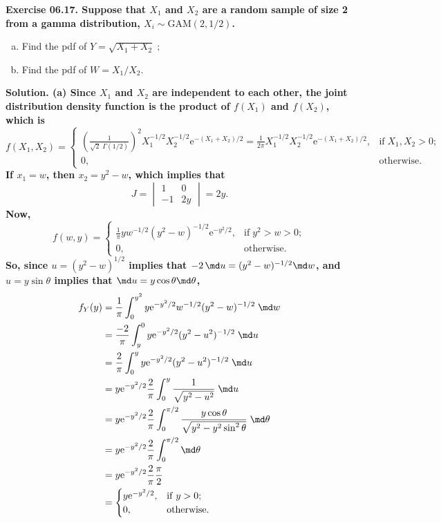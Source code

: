 \newcommand{\me}{\mathrm{e}}
\par{}
\vspace{1cm}

  \bf{Exercise 06.17.} Suppose that $X_1$ and $X_2$ are a random sample of size 2 from a gamma distribution, $X_i\sim\mathrm{GAM}(2,1/2)$.
    \begin{enumerate}[(a)]
      \item
        Find the pdf of $Y=\sqrt{X_1+X_2}\;;$
      \item
        Find the pdf of $W={X_1}/{X_2}$.
    \end{enumerate}


\bf{Solution.}
  (a) Since $X_1$ and $X_2$ are independent to each other,
  the joint distribution density function is the product of $f(X_1)$ and $f(X_2)$, which is
    $$
      f(X_1,X_2)=
        \begin{cases}
          \left(\frac{1}{\sqrt{2}\;\Gamma(1/2)}\right)^2X_1^{-1/2}X_2^{-1/2}\me^{-(X_1+X_2)\!/2}
          =\frac{1}{2\pi}X_1^{-1/2}X_2^{-1/2}\me^{-(X_1+X_2)/2}, & \mathrm{if}\;X_1,X_2>0; \\
          0, & \mathrm{otherwise}.
        \end{cases}
    $$
  If $x_1=w$, then $x_2=y^2-w$, which implies that
    $$
      J=
        \begin{vmatrix}
          1 & 0 \\
          -1 & 2y
        \end{vmatrix}
      =2y.
    $$
  Now,
    $$
      f(w,y)=
        \begin{cases}
          \frac{1}{\pi}yw^{-1/2}(y^2-w)^{-1/2}\me^{-y^2/2}, & \mathrm{if}\;y^2>w>0; \\
          0, & \mathrm{otherwise}.
        \end{cases}
    $$
  So, since $u=(y^2-w)^{1/2}$ implies that $-2\,\md u=(y^2-w)^{-1/2}\md w$, and $u=y\sin\theta$ implies that $\md u=y\cos\theta \md \theta$,
    \begin{align*}
      f_Y(y)&=\frac{1}{\pi}\int_0^{y^2}y\me^{-y^2/2}w^{-1/2}(y^2-w)^{-1/2}\;\md w \\
      &=\frac{-2}{\pi}\int_y^0y\me^{-y^2/2}(y^2-u^2)^{-1/2}\;\md u \\
      &=\frac{2}{\pi}\int_0^yy\me^{-y^2/2}(y^2-u^2)^{-1/2}\;\md u \\ &=y\me^{-y^2/2}\frac{2}{\pi}\int_0^y\frac{1}{\sqrt{y^2-u^2}}\;\md u\\
      &=y\me^{-y^2/2}\frac{2}{\pi}\int_0^{\pi/2}\frac{y\cos\theta}{\sqrt{y^2-y^2\sin^2\theta}}\;\md \theta\\
      &=y\me^{-y^2/2}\frac{2}{\pi}\int_0^{\pi/2}\md \theta\\
      &=y\me^{-y^2/2}\frac{2}{\pi}\frac{\pi}{2}\\
      &=\begin{cases}
         y\me^{-y^2/2}, & \mathrm{if}\;y>0; \\
          0, & \mathrm{otherwise}.
        \end{cases}
    \end{align*}

